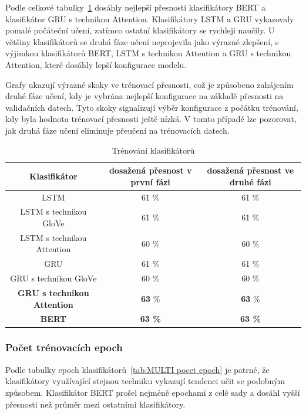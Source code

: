 Podle celkové tabulky~\ref{tab:MULTI trenovani klasifikatoru} dosáhly nejlepší přesnosti klasifikátory BERT a klasifikátor GRU s technikou Attention.
Klasifikátory LSTM a GRU vykazovaly pomalé počáteční učení, zatímco ostatní klasifikátory se rychleji naučily.
U většiny klasifikátorů se druhá fáze učení neprojevila jako výrazné zlepšení, s výjimkou klasifikátorů BERT, LSTM s technikou Attention a GRU s technikou Attention, které dosáhly lepší konfigurace modelu.

Grafy ukazují výrazné skoky ve trénovací přesnosti, což je způsobeno zahájením druhé fáze učení, kdy je vybrána nejlepší konfigurace na základě přesnosti na validačních datech.
Tyto skoky signalizují výběr konfigurace z počátku trénování, kdy byla hodnota trénovací přesnosti ještě nízká.
V tomto případě lze pozorovat, jak druhá fáze učení eliminuje přeučení na trénovacích datech.
\begin{table}[H]
	\centering
	\caption{Trénování klasifikátorů}\label{tab:MULTI trenovani klasifikatoru}
	\begin{tabular}{ c c c }
			\toprule
			Klasifikátor & dosažená přesnost v první fázi & dosažená přesnost ve druhé fázi\\
			\midrule
            LSTM & 61 \% & 61 \%\\
            LSTM s technikou GloVe & 61 \% & 61 \%\\
            LSTM s technikou Attention & 60 \% & 60 \%\\
            GRU & 61 \% & 61 \%\\
            GRU s technikou GloVe & 60 \% & 60 \%\\
            \textbf{GRU s technikou Attention} & \textbf{63} \% & \textbf{63} \%\\
            \textbf{BERT} & \textbf{63 \%} & \textbf{63 \%}\\
			\midrule
		\end{tabular}
\end{table}

\subsubsection{Počet trénovacích epoch}
Podle tabulky epoch klasifikátorů~\ref{tab:MULTI pocet epoch} je patrné, že klasifikátory využívající stejnou techniku vykazují tendenci učit se podobným způsobem.
Klasifikátor BERT prošel nejméně epochami z celé sady a dosáhl vyšší přesnosti než průměr mezi ostatními klasifikátory.

